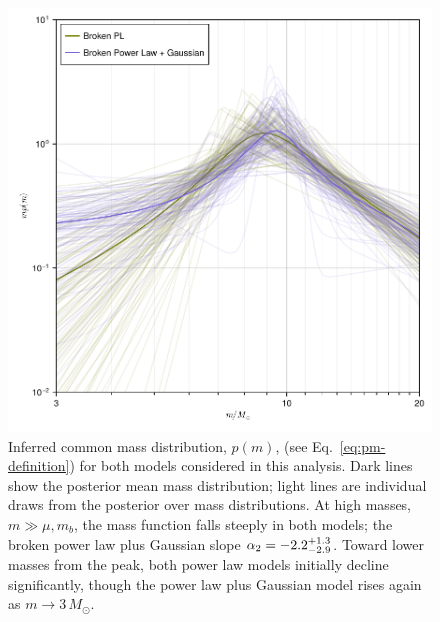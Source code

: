 \documentclass[modern]{aastex631}
\begin{document}
\begin{figure}
    \includegraphics[width=\columnwidth]{figures/pm_traces_including_230529.pdf}
    \caption{\label{fig:pm-traces_including_230529} Inferred common mass distribution, $p(m)$,
    (see Eq.~\eqref{eq:pm-definition}) for both models considered in this
    analysis.  Dark lines show the posterior mean mass distribution; light lines
    are individual draws from the posterior over mass distributions.  At high
    masses, $m \gg \mu, m_b$, the mass function falls steeply in both models;
    the broken power law plus Gaussian slope $\alpha_2 = -2.2^{+1.3}_{-2.9}$.
    Toward lower masses from the peak, both power law models initially decline
    significantly, though the power law plus Gaussian model rises again as $m
    \to 3 \, M_\odot$.}
\end{figure}
\end{document}
